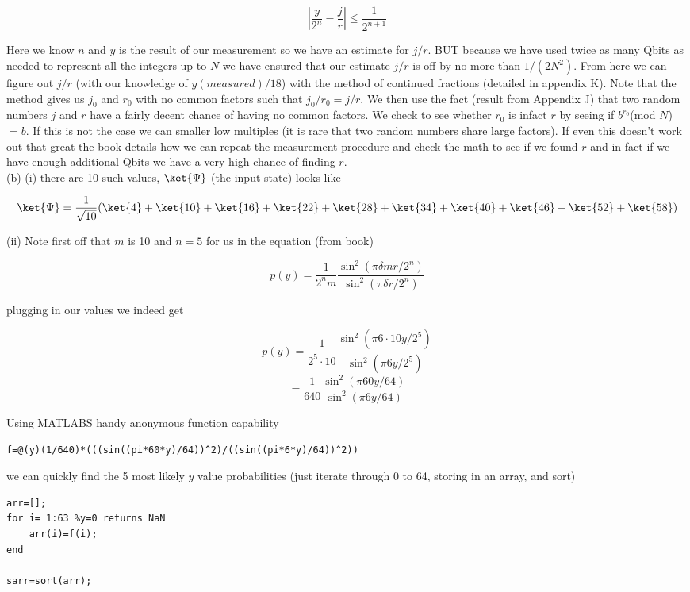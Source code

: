 $$\left|\frac{y}{2^n}-\frac{j}{r}\right|\leq\frac{1}{2^{n+1}}$$

Here we know $n$ and $y$ is the result of our measurement so we have an
estimate for $j/r$. BUT because we have used twice as many Qbits as needed to
represent all the integers up to $N$ we have ensured that our estimate $j/r$ is
off by no more than $1/(2N^2)$. From here we can figure out $j/r$ (with our
knowledge of $y(measured)/18$) with the
method of continued fractions (detailed in appendix K). Note that the method
gives us $j_0$ and $r_0$ with no common factors such that $j_0/r_0=j/r$. We
then use the fact (result from Appendix J) that two random numbers $j$ and $r$
have a fairly decent chance of having no common factors. We check to see
whether $r_0$ is infact $r$ by seeing if $b^{r_0}$(mod $N$)$=b$. If this is not
the case we can smaller low multiples (it is rare that two random numbers
share large factors). If even this doesn't work out that great the book
details how we can repeat the measurement procedure and check the math to see
if we found $r$ and in fact if we have enough additional Qbits we have a
very high chance of finding $r$.\\

(b) (i) there are 10 such values, $\ket{\Psi}$ (the input state) looks like

$$\ket{\Psi}=\frac{1}{\sqrt{10}}(\ket{4}+\ket{10}+\ket{16}+\ket{22}+\ket{28}+\ket{34}+\ket{40}+\ket{46}+\ket{52}+\ket{58})$$


(ii) Note first off that $m$ is 10 and $n=5$ for us in the equation (from
book)

$$p(y)=\frac{1}{2^nm}\frac{\sin^2(\pi\delta mr/2^n)}{\sin^2(\pi\delta r/2^n)}$$

plugging in our values we indeed get

$$p(y)=\frac{1}{2^5\cdot10}\frac{\sin^2(\pi6\cdot10 y/2^5)}{\sin^2(\pi
6y/2^5)}$$
$$=\frac{1}{640}\frac{\sin^2(\pi60 y/64)}{\sin^2(\pi6y/64)}$$

Using MATLABS handy anonymous function capability
\begin{verbatim}
f=@(y)(1/640)*(((sin((pi*60*y)/64))^2)/((sin((pi*6*y)/64))^2))
\end{verbatim}

we can quickly find the 5 most likely $y$ value probabilities (just iterate
through 0 to 64, storing in an array, and sort)\\

\begin{verbatim}
arr=[];
for i= 1:63 %y=0 returns NaN
    arr(i)=f(i);
end

sarr=sort(arr);

\end{verbatim}





